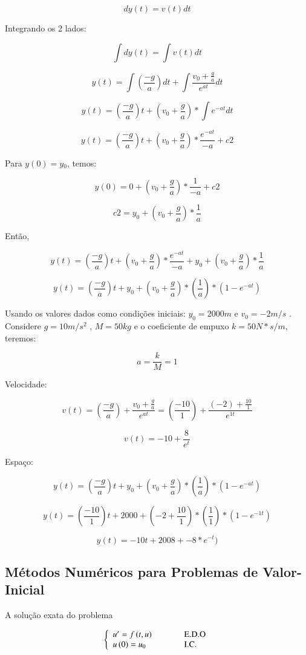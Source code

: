 \begin{example}
$$dy(t)=v(t)dt$$

Integrando os 2 lados:

$$\int dy(t)=\int v(t)dt$$

$$y(t)=\int(\frac{-g}{a})dt+\int\frac{v_{0}+\frac{g}{a}}{e^{at}}dt$$

$$y(t)=(\frac{-g}{a})t+(v_{0}+\frac{g}{a})*\int e^{-at}dt$$

$$y(t)=(\frac{-g}{a})t+(v_{0}+\frac{g}{a})*\frac{e^{-at}}{-a}+c2$$

Para $y(0)=y{}_{0}$, temos:

$$y(0)=0+(v_{0}+\frac{g}{a})*\frac{1}{-a}+c2$$

$$c2=y_{0}+(v_{0}+\frac{g}{a})*\frac{1}{a}$$

Então,

$$y(t)=(\frac{-g}{a})t+(v_{0}+\frac{g}{a})*\frac{e^{-at}}{-a}+y_{0}+(v_{0}+\frac{g}{a})*\frac{1}{a}$$

$$y(t)=(\frac{-g}{a})t+y_{0}+(v_{0}+\frac{g}{a})*(\frac{1}{a})*(1-e^{-at})$$

Usando os valores dados como condições iniciais: $y_{0}=2000m$ e $v_{0}=-2m/s$ . Considere $g=10m/s^{2}$ , $M = 50 kg$ e o coeficiente de empuxo $k = 50 N * s /m$, teremos:

$$a=\frac{k}{M}=1$$

Velocidade:

$$v(t)=(\frac{-g}{a})+\frac{v_{0}+\frac{g}{a}}{e^{at}}=(\frac{-10}{1})+\frac{(-2)+\frac{10}{1}}{e^{1t}}$$

$$v(t)=-10+\frac{8}{e^{t}}$$

Espaço:

$$y(t)=(\frac{-g}{a})t+y_{0}+(v_{0}+\frac{g}{a})*(\frac{1}{a})*(1-e^{-at})$$

$$y(t)=(\frac{-10}{1})t+2000+(-2+\frac{10}{1})*(\frac{1}{1})*(1-e^{-1t})$$

$$y(t)=-10t+2008+-8*e^{-t})$$
\end{example}


\subsection{Métodos Numéricos para Problemas de Valor-Inicial}

A solução exata do problema

\[
 \left\{
  \begin{array}{ll}
   u' = f \, (t, u) & \hspace*{1cm} \mbox{E.D.O} \\
   u \, (0) = u_0 & \hspace*{1cm} \mbox{I.C.}
  \end{array}
 \right.
\]

